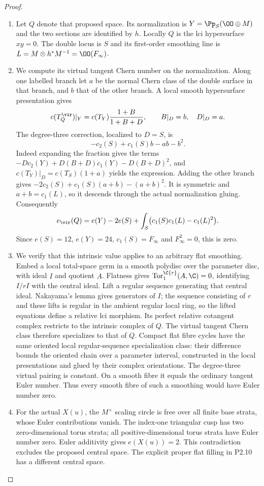 \begin{proof}
\begin{enumerate}[label=\arabic*.,leftmargin=*]
\item Let $Q$ denote that proposed space. Its normalization is $Y=\Pp_S(\OO\oplus M)$ and the two sections are identified by $h$. Locally $Q$ is the lci hypersurface $xy=0$. The double locus is $S$ and its first-order smoothing line is $L=M\otimes h^*M^{-1}=\OO(F_\infty)$.

\item We compute its virtual tangent Chern number on the normalization. Along one labelled branch let $a$ be the normal Chern class of the double surface in that branch, and $b$ that of the other branch. A local smooth hypersurface presentation gives
\[
 c(T_Q^{\vir})|_Y=c(T_Y)\frac{1+B}{1+B+D},\qquad B|_D=b,\quad D|_D=a.
\]
The degree-three correction, localized to $D=S$, is
\[
 -c_2(S)+c_1(S)b-ab-b^2.
\]
Indeed expanding the fraction gives the terms $-Dc_2(Y)+D(B+D)c_1(Y)-D(B+D)^2$, and $c(T_Y)|_D=c(T_S)(1+a)$ yields the expression. Adding the other branch gives $-2c_2(S)+c_1(S)(a+b)-(a+b)^2$. It is symmetric and $a+b=c_1(L)$, so it descends through the actual normalization gluing. Consequently
\[
 e_{\vir}(Q)=e(Y)-2e(S)+\int_S\bigl(c_1(S)c_1(L)-c_1(L)^2\bigr).
\]
Since $e(S)=12$, $e(Y)=24$, $c_1(S)=F_\infty$ and $F_\infty^2=0$, this is zero.

\item We verify that this intrinsic value applies to an arbitrary flat smoothing. Embed a local total-space germ in a smooth polydisc over the parameter disc, with ideal $I$ and quotient $A$. Flatness gives $\operatorname{Tor}_1^{\C\{r\}}(A,\C)=0$, identifying $I/rI$ with the central ideal. Lift a regular sequence generating that central ideal. Nakayama's lemma gives generators of $I$; the sequence consisting of $r$ and these lifts is regular in the ambient regular local ring, so the lifted equations define a relative lci morphism. Its perfect relative cotangent complex restricts to the intrinsic complex of $Q$. The virtual tangent Chern class therefore specializes to that of $Q$. Compact flat fibre cycles have the same oriented local regular-sequence specialization class: their difference bounds the oriented chain over a parameter interval, constructed in the local presentations and glued by their complex orientations. The degree-three virtual pairing is constant. On a smooth fibre it equals the ordinary tangent Euler number. Thus every smooth fibre of such a smoothing would have Euler number zero.

\item For the actual $X(u)$, the $M^\times$ scaling circle is free over all finite base strata, whose Euler contributions vanish. The index-one triangular cusp has two zero-dimensional torus strata; all positive-dimensional torus strata have Euler number zero. Euler additivity gives $e(X(u))=2$. This contradiction excludes the proposed central space. The explicit proper flat filling in P2.10 has a different central space.
\end{enumerate}
\end{proof}